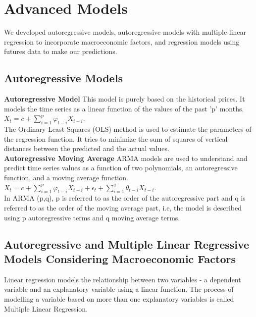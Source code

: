 \documentclass[runningheads]{llncs}
\begin{document}
\section{Advanced Models}

We developed autoregressive models, autoregressive models with multiple linear regression to incorporate macroeconomic factors, and regression models using futures data to make our predictions. \\

\subsection{Autoregressive Models}
\noindent\textbf{Autoregressive Model} This model is purely based on the historical prices. It models the time series as a linear function of the values of the past 'p' months.\\

$ X_{t} = c + \sum\limits_{i=1}^p \varphi_{t-i}X_{t-i}$. \\

\noindent The Ordinary Least Squares (OLS) method is used to estimate the parameters of the regression function. It tries to minimize the sum of squares of vertical distances between the predicted and the actual values. \\

\noindent\textbf{Autoregressive Moving Average} ARMA models are used to understand and predict time series values as a function of two polynomials, an autoregressive function, and a moving average function. 
\\

$ X_{t} = c + \sum\limits_{i=1}^p \varphi_{t-i}X_{t-i} + \epsilon_{t} + \sum\limits_{i=1}^q \theta_{t-i}X_{t-i}$.\\

\noindent In ARMA (p,q), p is referred to as the order of the autoregressive part and q is referred to as the order of the moving average part, i.e, the model is described using p autoregressive terms and q moving average terms.\\ 

\subsection{Autoregressive and Multiple Linear Regressive Models Considering Macroeconomic Factors}
Linear regression models the relationship between two variables - a dependent variable and an explanatory variable using a linear function. The process of modelling a variable based on more than one explanatory variables is called Multiple Linear Regression. \\
   
\end{document}
